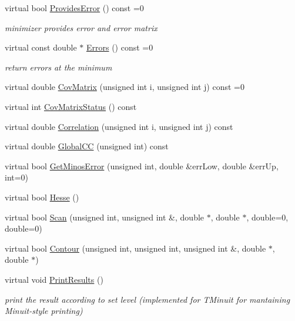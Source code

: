 \begin{DoxyCompactItemize}
\item 
virtual bool \mbox{\hyperlink{classROOT_1_1Math_1_1Minimizer_a71837caa295c76303c1a14679be1898d}{Provides\+Error}} () const =0
\begin{DoxyCompactList}\small\item\em minimizer provides error and error matrix \end{DoxyCompactList}\item 
virtual const double $\ast$ \mbox{\hyperlink{classROOT_1_1Math_1_1Minimizer_a42f71e22f16cf4c59b621cf7e1e75f3d}{Errors}} () const =0
\begin{DoxyCompactList}\small\item\em return errors at the minimum \end{DoxyCompactList}\item 
virtual double \mbox{\hyperlink{classROOT_1_1Math_1_1Minimizer_a01b0ec371972dab12ca3b9c962d952f8}{Cov\+Matrix}} (unsigned int i, unsigned int j) const =0
\item 
virtual int \mbox{\hyperlink{classROOT_1_1Math_1_1Minimizer_a5f5eab490760ff361d9c44369e9d754d}{Cov\+Matrix\+Status}} () const
\item 
virtual double \mbox{\hyperlink{classROOT_1_1Math_1_1Minimizer_a9ba2f4bc3c8c0e905f2c018e79809c0e}{Correlation}} (unsigned int i, unsigned int j) const
\item 
virtual double \mbox{\hyperlink{classROOT_1_1Math_1_1Minimizer_a6b50b0b0ccb0cb23da281ef978d145c5}{Global\+CC}} (unsigned int) const
\item 
virtual bool \mbox{\hyperlink{classROOT_1_1Math_1_1Minimizer_aeaef75b766eff7088939259c842ab056}{Get\+Minos\+Error}} (unsigned int, double \&err\+Low, double \&err\+Up, int=0)
\item 
virtual bool \mbox{\hyperlink{classROOT_1_1Math_1_1Minimizer_ae903e5936bef4ea7fac3301f9cdc50be}{Hesse}} ()
\item 
virtual bool \mbox{\hyperlink{classROOT_1_1Math_1_1Minimizer_a1e6e4b32d7338a7a08791cff67f54080}{Scan}} (unsigned int, unsigned int \&, double $\ast$, double $\ast$, double=0, double=0)
\item 
virtual bool \mbox{\hyperlink{classROOT_1_1Math_1_1Minimizer_aeb8855190ff2e37911c38ed839f2043c}{Contour}} (unsigned int, unsigned int, unsigned int \&, double $\ast$, double $\ast$)
\item 
virtual void \mbox{\hyperlink{classROOT_1_1Math_1_1Minimizer_aea1c5d69c6a1c1f2cf4d17a523862560}{Print\+Results}} ()
\begin{DoxyCompactList}\small\item\em print the result according to set level (implemented for T\+Minuit for mantaining Minuit-\/style printing) \end{DoxyCompactList}\item 

\end{DoxyCompactItemize}

